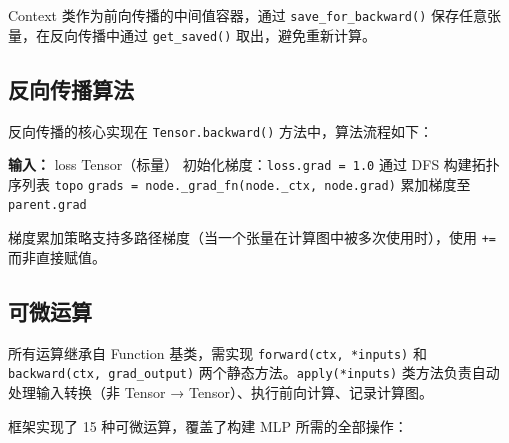 \documentclass[12pt,a4paper]{ctexart}
\begin{document}
Context 类作为前向传播的中间值容器，通过 \texttt{save\_for\_backward()} 保存任意张量，在反向传播中通过 \texttt{get\_saved()} 取出，避免重新计算。

\subsection{反向传播算法}

反向传播的核心实现在 \texttt{Tensor.backward()} 方法中，算法流程如下：

\begin{algorithm}[H]
\caption{反向传播算法}
\begin{algorithmic}[1]
\State \textbf{输入：} loss Tensor（标量）
\State 初始化梯度：\texttt{loss.grad = 1.0}
\State 通过 DFS 构建拓扑序列表 \texttt{topo}
        \State \texttt{grads = node.\_grad\_fn(node.\_ctx, node.grad)}
                \State 累加梯度至 \texttt{parent.grad}
            \EndIf
        \EndFor
    \EndIf
\EndFor
\end{algorithmic}
\end{algorithm}

梯度累加策略支持多路径梯度（当一个张量在计算图中被多次使用时），使用 \texttt{+=} 而非直接赋值。

\subsection{可微运算}

所有运算继承自 Function 基类，需实现 \texttt{forward(ctx, *inputs)} 和 \texttt{backward(ctx, grad\_output)} 两个静态方法。\texttt{apply(*inputs)} 类方法负责自动处理输入转换（非 Tensor → Tensor）、执行前向计算、记录计算图。

框架实现了 15 种可微运算，覆盖了构建 MLP 所需的全部操作：
\end{document}
